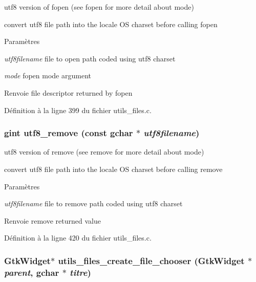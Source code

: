 utf8 version of fopen (see fopen for more detail about mode) 

convert utf8 file path into the locale OS charset before calling fopen


\begin{DoxyParams}{Paramètres}
\item[{\em utf8filename}]file to open path coded using utf8 charset \item[{\em mode}]fopen mode argument\end{DoxyParams}
\begin{DoxyReturn}{Renvoie}
file descriptor returned by fopen 
\end{DoxyReturn}


Définition à la ligne 399 du fichier utils\_\-files.c.

\subsubsection[{utf8\_\-remove}]{\setlength{\rightskip}{0pt plus 5cm}gint utf8\_\-remove (const gchar $\ast$ {\em utf8filename})}\label{utils__files_8h_a79409776739f0f2778cd6d4f477b6dd2}


utf8 version of remove (see remove for more detail about mode) 

convert utf8 file path into the locale OS charset before calling remove


\begin{DoxyParams}{Paramètres}
\item[{\em utf8filename}]file to remove path coded using utf8 charset\end{DoxyParams}
\begin{DoxyReturn}{Renvoie}
remove returned value 
\end{DoxyReturn}


Définition à la ligne 420 du fichier utils\_\-files.c.

\subsubsection[{utils\_\-files\_\-create\_\-file\_\-chooser}]{\setlength{\rightskip}{0pt plus 5cm}GtkWidget$\ast$ utils\_\-files\_\-create\_\-file\_\-chooser (GtkWidget $\ast$ {\em parent}, \/  gchar $\ast$ {\em titre})}\label{utils__files_8h_ad52941b893b0fcc21576cebdaa93fe96}


